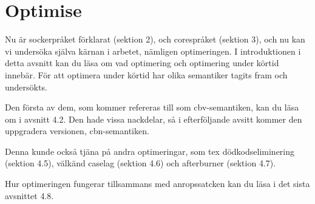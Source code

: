 \documentclass[Rapport]{subfiles}
\begin{document}
\section{Optimise}


Nu är sockerpråket förklarat (sektion 2), och corespråket (sektion 3),
och nu kan vi undersöka själva kärnan i arbetet, nämligen optimeringen.
I introduktionen i detta avsnitt kan du läsa om vad optimering och 
optimering under körtid innebär. För att optimera under körtid har 
olika semantiker tagits fram och undersökts.
    
Den första av dem, som kommer refereras till som cbv-semantiken, 
kan du läsa om i avsnitt 4.2. Den hade vissa nackdelar, så i 
efterföljande avsitt kommer den uppgradera versionen, cbn-semantiken.

Denna kunde också tjäna på andra optimeringar, som tex
dödkodseliminering (sektion 4.5), 
välkänd caselag (sektion 4.6) och 
afterburner (sektion 4.7).

Hur optimeringen fungerar tillsammans med anropssatcken
kan du läsa i det sista avsnittet 4.8.












\end{document}

